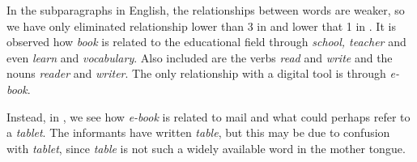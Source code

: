 \documentclass[english]{textolivre}
\begin{document}
In the subparagraphs in English, the relationships between words are weaker, so we have only eliminated relationship lower than 3 in  and lower that 1 in . It is observed how \textit{book} is related to the educational field through \textit{school, teacher} and even \textit{learn} and \textit{vocabulary}. Also included are the verbs \textit{read} and \textit{write} and the nouns \textit{reader} and \textit{writer}. The only relationship with a digital tool is through \textit{e-book}.

Instead, in , we see how \textit{e-book} is related to mail and what could perhaps refer to a \textit{tablet}. The informants have written \textit{table}, but this may be due to confusion with \textit{tablet}, since \textit{table} is not such a widely available word in the mother tongue.
\end{document}
